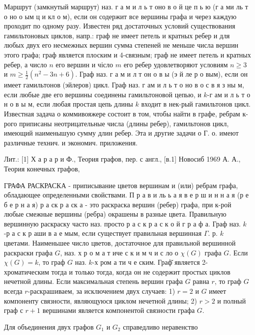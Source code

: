 \documentclass[10pt]{article}
\begin{document}
Маршрут (замкнутый маршрут) наз. г а м и л ь т оно в о й це п ь ю (г а ми ль т о но о ым ц и кл о м), если он содержит все вершины графа и через каждую проходит по одному разу. Известен ряд достаточных условий существования гамильтоновых циклов, напр.: граф не имеет петель и кратных ребер и для любых двух его несмежных вершин сумма степеней не меньше числа вершин этого графа; граф является плоским и 4-связным; граф не имеет петель и кратных ребер, а число $n$ его вершин и чісло $m$ его ребер удовлетворяют условиям $n \geqslant 3$ и $m \geqslant \frac{1}{2}\left(n^{2}-3 n+6\right)$. Граф наз. г а м и л т он о в ы (э й ле р о вым), если он имеет гамильтонов (эйлеров) цикл. Граф наз. г ам и л ь т о но в о с в я з ны м, если любые две его вершины соединены гамильтоновой цепью, и $k$-г ам и л ь т о н о в ы м, если любая простая цепь длины $k$ входит в нек-рый гамильтонов цикл. Известная задача о коммивояжере состоит в том, чтобы найти в графе, ребрам к-рого приписаны неотрицательные числа (длины ребер), гамильтонов цикл, имеющий наименышую сумму длин ребер. Эта и другие задачи о Г. о. имеют различные технич. и экономич. приложения.



Лит.: [1] Х а р а р и Ф., Теория графов, пер. с англ., [в.1] Новосиб 1969 А. А., Теория конечных графов,



ГРАФА РАСКРАСКА - приписывание цветов вершинам и (или) ребрам графа, обладающее определенными свойствами. П р а в и ль ь а я в е р ш и н н а я (р е б е р н а я) р а ск р а ск а - это раскраска вершин (ребер) графа, при к-рой любые смежные вершины (ребра) окрашены в разные цвета. Правильную вершинную раскраску часто наз. просто р а с к р а с к о й г р а ф а. Граф наз. $k$-р а с к р аши в а е мым, если существует правильная вершинная $\Gamma$. р. $k$ цветами. Наименьшее число цветов, достаточное для правильной вершинной раскраски графа $G$, наз. х р о м а т иче с к и м ч и с ло о $\chi(G)$ графа $G$. Если $\chi(G)=k$, то граф $G$ наз. $k$-х ром а ти ч е ским. Граф̆ является 2-хроматическим тогда и только тогда, когда он не содержит простых циклов нечетной длины. Если максимальная степень вершин графа $G$ равна $r$, то граф $G$ всегда $r$-раскрашиваем, за исключением двух случаев: 1) $r=2$ и $G$ имеет компоненту связности, являющуюся циклом нечетной длины; 2) $r>2$ и полный граф с $r+1$ вершинами является компонентой связности графа $G$.



Для объединения двух графов $G_{1}$ и $G_{2}$ справедливо неравенство
\end{document}
